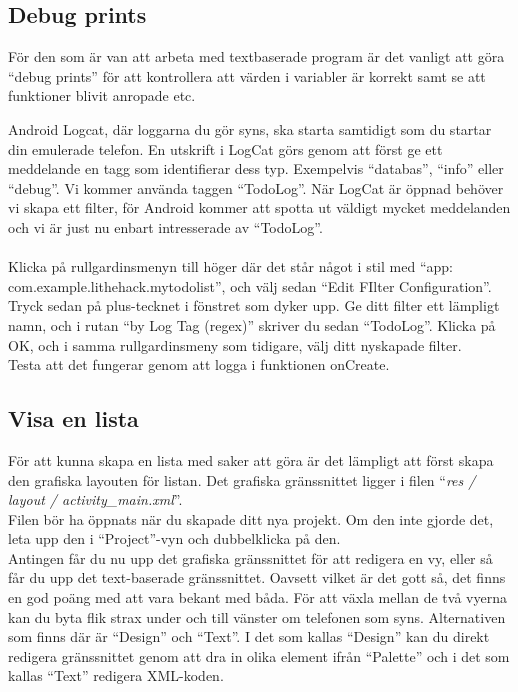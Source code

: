 \documentclass[11 pt, titlepage]{article} %
\begin{document}
\subsection{Debug prints}
För den som är van att arbeta med textbaserade program är det vanligt att göra “debug prints” för att kontrollera att värden i variabler är korrekt samt se att funktioner blivit anropade etc.

Android Logcat, där loggarna du gör syns, ska starta samtidigt som du startar din emulerade telefon.
En utskrift i LogCat görs genom att först ge ett meddelande en tagg som identifierar dess typ. Exempelvis “databas”, “info” eller “debug”. Vi kommer använda taggen “TodoLog”. När LogCat är öppnad behöver vi skapa ett filter, för Android kommer att spotta ut väldigt mycket meddelanden och vi är just nu enbart intresserade av “TodoLog”.\\
\\
Klicka på rullgardinsmenyn till höger där det står något i stil med ``app: com.example.lithehack.mytodolist'', och välj sedan ``Edit FIlter Configuration''. Tryck sedan på plus-tecknet i fönstret som dyker upp. Ge ditt filter ett lämpligt namn, och i rutan ``by Log Tag (regex)'' skriver du sedan ``TodoLog''. Klicka på OK, och i samma rullgardinsmeny som tidigare, välj ditt nyskapade filter.\\

Testa att det fungerar genom att logga i funktionen onCreate.


\subsection{Visa en lista}
För att kunna skapa en lista med saker att göra är det lämpligt att först skapa den grafiska layouten för listan. Det grafiska gränssnittet ligger i filen “\textit{res / layout / activity\_main.xml}”.\\
Filen bör ha öppnats när du skapade ditt nya projekt. Om den inte gjorde det, leta upp den i ``Project''-vyn och dubbelklicka på den. \\

Antingen får du nu upp det grafiska gränssnittet för att redigera en vy, eller så får du upp det text-baserade gränssnittet.
Oavsett vilket är det gott så, det finns en god poäng med att vara bekant med båda.
För att växla mellan de två vyerna kan du byta flik strax under och till vänster om telefonen som syns.
Alternativen som finns där är ``Design'' och ``Text''.
I det som kallas ``Design'' kan du direkt redigera gränssnittet genom att dra in olika element ifrån “Palette” och i det som kallas ``Text'' redigera XML-koden.\\
\end{document}
